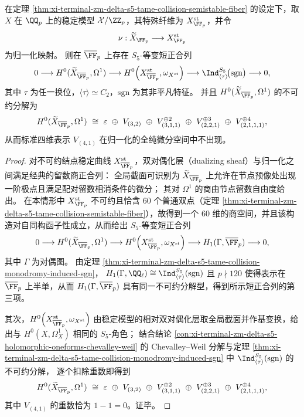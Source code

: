 \begin{theorem}\label{thm:xi-terminal-zm-delta-s5-tame-collision-hodge-subtraction}
在定理 \ref{thm:xi-terminal-zm-delta-s5-tame-collision-semistable-fiber} 的设定下，取 \(X\) 在 \(\QQ_p\) 上的稳定模型 \(\mathcal X/\ZZ_p\)，其特殊纤维为 \(X^{\mathrm{st}}_{\FF_p}\)，并令
\[
\nu:\widetilde X_{\FF_p}\longrightarrow X^{\mathrm{st}}_{\FF_p}
\]
为归一化映射。
则在 \(\overline{\FF}_p\) 上存在 \(S_5\)-等变短正合列
\[
0\longrightarrow H^0(\widetilde X_{\overline{\FF}_p},\Omega^1)\longrightarrow
H^0\!\left(X^{\mathrm{st}}_{\overline{\FF}_p},\omega_{X^{\mathrm{st}}}\right)\longrightarrow
\Ind^{S_5}_{\langle\tau\rangle}\!\bigl(\mathrm{sgn}\bigr)\longrightarrow 0,
\]
其中 \(\tau\) 为任一换位，\(\langle\tau\rangle\simeq C_2\)，\(\mathrm{sgn}\) 为其非平凡特征。
并且 \(H^0(\widetilde X_{\overline{\FF}_p},\Omega^1)\) 的不可约分解为
\[
H^0(\widetilde X_{\overline{\FF}_p},\Omega^1)\ \cong\
\varepsilon
\ \oplus\ V_{(3,2)}
\ \oplus\ V_{(3,1,1)}^{\oplus 2}
\ \oplus\ V_{(2,2,1)}^{\oplus 3}
\ \oplus\ V_{(2,1,1,1)}^{\oplus 4},
\]
从而标准四维表示 \(V_{(4,1)}\) 在归一化的全纯微分空间中不出现。
\end{theorem}
\begin{proof}
对不可约结点稳定曲线 \(X^{\mathrm{st}}_{\overline{\FF}_p}\)，双对偶化层（dualizing sheaf）与归一化之间满足经典的留数商正合列：
全局截面可识别为 \(\widetilde X_{\overline{\FF}_p}\) 上允许在节点预像处出现一阶极点且满足配对留数相消条件的微分；
其对 \(\Omega^1\) 的商由节点留数自由度给出。
在本情形中 \(X^{\mathrm{st}}_{\FF_p}\) 不可约且恰含 \(60\) 个普通双点（定理 \ref{thm:xi-terminal-zm-delta-s5-tame-collision-semistable-fiber}），故得到一个 \(60\) 维的商空间，并且该构造对自同构函子性成立，从而给出 \(S_5\)-等变短正合列
\[
0\longrightarrow H^0(\widetilde X_{\overline{\FF}_p},\Omega^1)\longrightarrow
H^0\!\left(X^{\mathrm{st}}_{\overline{\FF}_p},\omega_{X^{\mathrm{st}}}\right)\longrightarrow
H_1(\Gamma,\overline{\FF}_p)\longrightarrow 0,
\]
其中 \(\Gamma\) 为对偶图。
由定理 \ref{thm:xi-terminal-zm-delta-s5-tame-collision-monodromy-induced-sgn}，
\(
H_1(\Gamma,\QQ_\ell)\cong \Ind^{S_5}_{\langle\tau\rangle}(\mathrm{sgn})
\)
且 \(p\nmid 120\) 使得表示在 \(\overline{\FF}_p\) 上半单，从而 \(H_1(\Gamma,\overline{\FF}_p)\) 具有同一不可约分解型，得到所示短正合列的第三项。
\par
其次，\(H^0\!\left(X^{\mathrm{st}}_{\overline{\FF}_p},\omega_{X^{\mathrm{st}}}\right)\) 由稳定模型的相对双对偶化层取全局截面并作基变换，给出与 \(H^0(X,\Omega_X^1)\) 相同的 \(S_5\)-角色；
结合结论 \ref{con:xi-terminal-zm-delta-s5-holomorphic-oneforms-chevalley-weil} 的 Chevalley--Weil 分解与定理 \ref{thm:xi-terminal-zm-delta-s5-tame-collision-monodromy-induced-sgn} 中
\(
\Ind^{S_5}_{\langle\tau\rangle}(\mathrm{sgn})
\)
的不可约分解，
逐个扣除重数即得到
\[
H^0(\widetilde X_{\overline{\FF}_p},\Omega^1)
\ \cong\
\varepsilon
\ \oplus\ V_{(3,2)}
\ \oplus\ V_{(3,1,1)}^{\oplus 2}
\ \oplus\ V_{(2,2,1)}^{\oplus 3}
\ \oplus\ V_{(2,1,1,1)}^{\oplus 4},
\]
其中 \(V_{(4,1)}\) 的重数恰为 \(1-1=0\)。证毕。
\end{proof}

